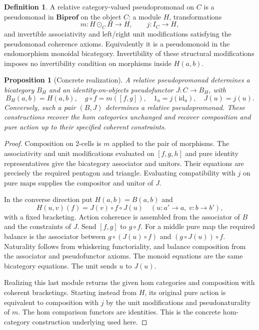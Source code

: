 \documentclass[11pt]{article}
\newtheorem{proposition}[theorem]{Proposition}
\theoremstyle{definition}
\newtheorem{definition}[theorem]{Definition}
\newcommand{\Biprof}{\mathbf{Biprof}}
\newcommand{\id}{\mathrm{id}}
\begin{document}
\begin{definition}\label{def:relative}
A relative category-valued pseudopromonad on $C$ is a pseudomonad in
$\Biprof$ on the object $C$: a module $H$, transformations
\[
 m:H\odot_C H\longrightarrow H,\qquad j:I_C\longrightarrow H,
\]
and invertible associativity and left/right unit modifications satisfying
the pseudomonad coherence axioms. Equivalently it is a pseudomonoid in the
endomorphism monoidal bicategory. Invertibility of these structural
modifications imposes no invertibility condition on morphisms inside
$H(a,b)$.
\end{definition}

\begin{proposition}[Concrete realization]\label{prop:realization}
A relative pseudopromonad determines a bicategory $B_H$ and an
identity-on-objects pseudofunctor $J:C\to B_H$, with
\[
 B_H(a,b)=H(a,b),\quad g\circ f=m([f,g]),\quad
 1_a=j(\id_a),\quad J(u)=j(u).
\]
Conversely, such a pair $(B,J)$ determines a relative pseudopromonad. These
constructions recover the hom categories unchanged and recover composition
and pure action up to their specified coherent constraints.
\end{proposition}
\begin{proof}
Composition on 2-cells is $m$ applied to the pair of morphisms. The
associativity and unit modifications evaluated on $[f,g,h]$ and pure identity
representatives give the bicategory associator and unitors. Their equations
are precisely the required pentagon and triangle. Evaluating compatibility
with $j$ on pure maps supplies the compositor and unitor of $J$.

In the converse direction put $H(a,b)=B(a,b)$ and
\[
 H(u,v)(f)=J(v)\circ f\circ J(u)
 \quad (u:a'\to a,\ v:b\to b'),
\]
with a fixed bracketing. Action coherence is assembled from the associator of
$B$ and the constraints of $J$. Send $[f,g]$ to $g\circ f$. For a middle
pure map the required balance is the associator between
$g\circ(J(u)\circ f)$ and $(g\circ J(u))\circ f$. Naturality follows from
whiskering functoriality, and balance composition from the associator and
pseudofunctor axioms. The monoid equations are the same bicategory equations.
The unit sends $u$ to $J(u)$.

Realizing this last module returns the given hom categories and composition
with coherent bracketings. Starting instead from $H$, its original pure action
is equivalent to composition with $j$ by the unit modifications and
pseudonaturality of $m$. The hom comparison functors are identities. This is
the concrete hom-category construction underlying
\cite[Theorem 4.1.3 and Definition 4.1.8]{Lawler} used here.
\end{proof}
\end{document}

